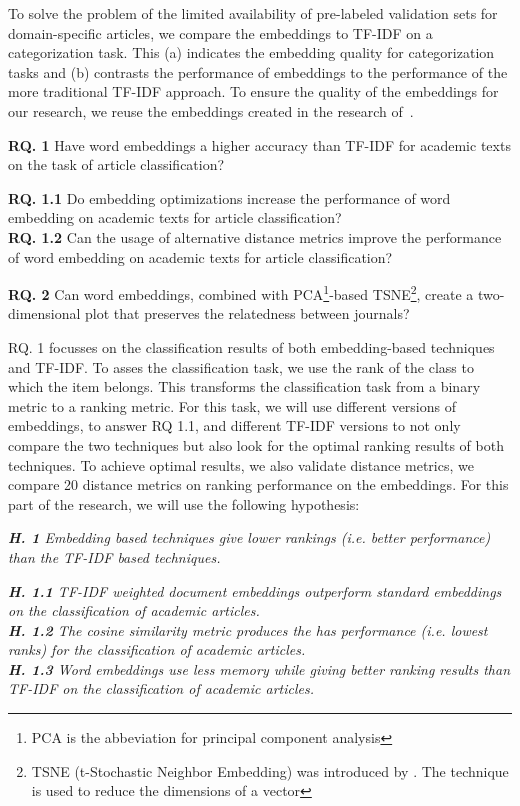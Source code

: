 \documentclass[../../Thesis.tex]{subfiles}
\begin{document}
To solve the problem of the limited availability of pre-labeled validation sets for domain-specific articles, we compare the embeddings to  TF-IDF on a categorization task. This (a) indicates the embedding quality for categorization tasks and (b) contrasts the performance of embeddings to the performance of the more traditional TF-IDF approach. To ensure the quality of the embeddings for our research, we reuse the embeddings created in the research of~\citet{Truong2017Thesis}.
\begin{jumpin}
    \textbf{RQ. 1} Have word embeddings a higher accuracy than TF-IDF for academic texts on the task of article classification?\\
    \begin{adjustwidth}{0.3in}{}
        \textbf{RQ. 1.1} Do embedding optimizations increase the performance of word embedding on academic texts for article classification?\\
        \textbf{RQ. 1.2} Can the usage of alternative distance metrics improve the performance of word embedding on academic texts for article classification?
    \end{adjustwidth}
    \vspace{0.1in}\textbf{RQ. 2} Can word embeddings, combined with PCA\footnote{PCA is the abbeviation for principal component analysis}-based TSNE\footnote{TSNE (t-Stochastic Neighbor Embedding) was introduced by \citet{maaten2008visualizing}. The technique is used to reduce the dimensions of a vector}, create a two-dimensional plot that preserves the relatedness between journals?
\end{jumpin}
\clearpage
{}
RQ. 1 focusses on the classification results of both embedding-based techniques and TF-IDF.  To asses the classification task, we use the rank of the class to which the item belongs. This transforms the classification task from a binary metric to a ranking metric. For this task, we will use different versions of embeddings, to answer RQ 1.1, and different TF-IDF versions to not only compare the two techniques but also look for the optimal ranking results of both techniques. To achieve optimal results, we also validate distance metrics, we compare 20 distance metrics on ranking performance on the embeddings. For this part of the research, we will use the following hypothesis:
\begin{jumpin}
\textit{\textbf{H. 1} Embedding based techniques give lower rankings (i.e. better performance) than the TF-IDF based techniques.}
\begin{jumpin}
\textit{\textbf{H. 1.1} TF-IDF weighted document embeddings outperform standard embeddings on the classification of academic articles.}\\
\textit{\textbf{H. 1.2} The cosine similarity metric produces the has performance (i.e. lowest ranks) for the classification of academic articles.}\\
\textit{\textbf{H. 1.3} Word embeddings use less memory while giving better ranking results than TF-IDF on the classification of academic articles.}
\end{jumpin}
\end{jumpin}
\end{document}
